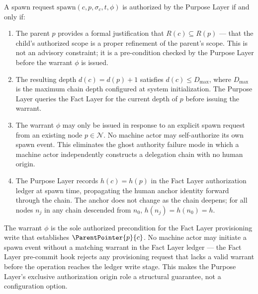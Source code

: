 \begin{dfn}
\label{dfn:rs-spawn-authorization}
A spawn request $\mathrm{spawn}(c, p, \sigma_c, t, \phi)$ is authorized by the Purpose Layer if and only if:

\begin{enumerate}
    \item[(SA1) \textbf{Scope refinement justification.}] The parent $p$ provides a formal justification that $R(c) \subseteq R(p)$ --- that the child's authorized scope is a proper refinement of the parent's scope. This is not an advisory constraint; it is a pre-condition checked by the Purpose Layer before the warrant $\phi$ is issued.

    \item[(SA2) \textbf{Depth availability.}] The resulting depth $d(c) = d(p) + 1$ satisfies $d(c) \leq D_{\max}$, where $D_{\max}$ is the maximum chain depth configured at system initialization. The Purpose Layer queries the Fact Layer for the current depth of $p$ before issuing the warrant.

    \item[(SA3) \textbf{No autonomous bootstrapping.}] The warrant $\phi$ may only be issued in response to an explicit spawn request from an existing node $p \in \mathcal{N}$. No machine actor may self-authorize its own spawn event. This eliminates the ghost authority failure mode in which a machine actor independently constructs a delegation chain with no human origin.

    \item[(SA4) \textbf{Human anchor propagation.}] The Purpose Layer records $h(c) = h(p)$ in the Fact Layer authorization ledger at spawn time, propagating the human anchor identity forward through the chain. The anchor does not change as the chain deepens; for all nodes $n_j$ in any chain descended from $n_0$, $h(n_j) = h(n_0) = h$.
\end{enumerate}
\end{dfn}

The warrant $\phi$ is the sole authorized precondition for the Fact Layer provisioning write that establishes $\ParentPointer{p}{c}$. No machine actor may initiate a spawn event without a matching warrant in the Fact Layer ledger --- the Fact Layer pre-commit hook rejects any provisioning request that lacks a valid warrant before the operation reaches the ledger write stage. This makes the Purpose Layer's exclusive authorization origin role a structural guarantee, not a configuration option.

